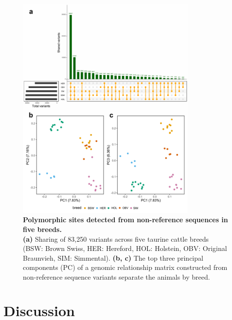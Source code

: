 \documentclass[../main.tex]{subfiles}
\begin{document}
\begin{figure}[!htb]
    \centering
    \includegraphics[width=0.8\textwidth]{paper3/main_figure/Fig5.pdf}
        \caption[Polymorphic sites detected from non-reference sequences in five breeds]{\textbf{Polymorphic sites detected from non-reference sequences in five breeds.} \\
        \footnotesize{\textbf{(a)} Sharing of 83,250 variants across five taurine cattle breeds (BSW: Brown Swiss, HER: Hereford, HOL: Holstein, OBV: Original Braunvieh, SIM: Simmental). \textbf{(b, c)} The top three principal components (PC) of a genomic relationship matrix constructed from non-reference sequence variants separate the animals by breed.}}
        \label{fig45:varnrf}
\end{figure}


\section{Discussion}
\end{document}
